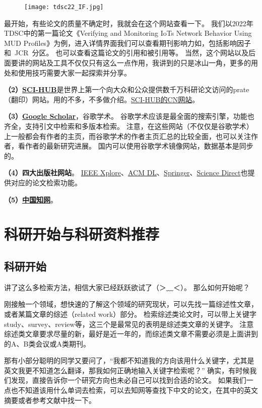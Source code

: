 \documentclass[lang=cn,11pt,a4paper]{elegantpaper}
\begin{document}
\begin{figure}[!htb]
\centering
\texttt{[image: tdsc22\_IF.jpg]}
\caption{}
\label{fig.tdsc22_IF}
\end{figure}
最开始，有些论文的质量不确定时，我就会在这个网站查看一下。
我们以2022年TDSC中的第一篇论文《Verifying and Monitoring IoTs Network Behavior Using MUD Profiles》为例，进入详情界面我们可以查看期刊影响力如，包括影响因子和~JCR~分区。
也可以查看这篇论文的引用和被引用等。
当然，这个网站以及后面要讲的网站及工具不仅仅只有这么一点作用，我讲到的只是冰山一角，更多的用处和使用技巧需要大家一起探索并分享。

\textbf{（2）\href{https://sci-hub.shop/}{SCI-HUB}}是世界上第一个向大众和公众提供数千万科研论文访问的prate（翻印）网站。用的不多，不多做介绍。\href{https://s1.sci-hub.org.cn/}{SCI-HUB的CN网站}。

\textbf{（3）\href{https://scholar.google.com/}{Google Scholar}}，谷歌学术。
谷歌学术应该是最全面的搜索引擎，功能也齐全，支持引文中检索和多版本检索。
注意，在这些网站（不仅仅是谷歌学术）上一般都会有作者的主页，而谷歌学术的作者主页汇总的比较全面，也可以关注作者，看作者的最新研究进展。
国内可以使用谷歌学术镜像网站，数据基本是同步的。

\textbf{（4）四大出版社网站}。
\href{https://ieeexplore.ieee.org/Xplore/home.jsp}{IEEE Xplore}、\href{https://dl.acm.org/}{ACM DL}、\href{https://link.springer.com/}{Springer}、\href{https://www.sciencedirect.com/}{Science Direct}也提供对应的论文检索功能。

\textbf{（5）\href{https://www.cnki.net/
}{中国知网}}。

\section{科研开始与科研资料推荐}
\subsection{科研开始}
讲了这么多检索方法，相信大家已经跃跃欲试了（＞﹏＜）。
那么如何开始呢？

刚接触一个领域，想快速的了解这个领域的研究现状，可以先找一篇综述性文章，或者某篇文章的综述（related work）部分。
检索综述类论文时，可以带上关键字study、survey、review等，这三个是最常见的表明是综述类文章的关键字。
注意综述类文章要求尽量的新，最好是近一年的，而综述类文章不需要必须是上面讲到的A、B类会议或A类期刊。

那有小部分聪明的同学又要问了，“我都不知道我的方向该用什么关键字，尤其是英文我更不知道怎么翻译，那我如何正确地输入关键字检索呢？”
确实，有时候我们发现，直接告诉你一个研究方向也未必自己可以找到合适的论文。
如果我们一点也不知道该用什么单词去检索，可以去知网等查找下中文的论文，在其中的英文摘要或者参考文献中找一下。
\end{document}
